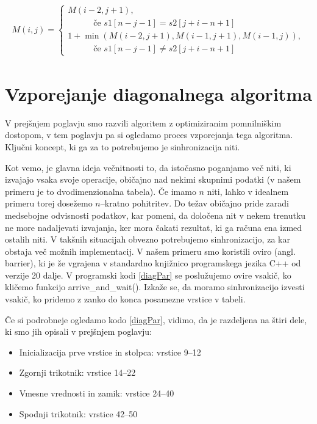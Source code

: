 \documentclass[a4paper,12pt,openright]{book}
\begin{document}
\begin{itemize}
\begin{equation}
\label{diagEq5}
\begin{aligned}
M(i, j) =
\begin{cases}
     M(i-2, j+1) ,     \\ \quad \quad \quad \text{če } s1[n-j-1]=s2[j+i-n+1]\\
     1 + \min(M(i-2, j+1), M(i-1, j+1), M(i-1, j)) , \\ \quad \quad \quad \text{če } s1[n-j-1] \neq s2[j+i-n+1]
  \end{cases}
\end{aligned}
\end{equation}

\end{itemize}

\section{Vzporejanje diagonalnega algoritma}

V prejšnjem poglavju smo razvili algoritem z optimiziranim pomnilniškim dostopom, v tem poglavju pa si ogledamo proces vzporejanja tega algoritma. Ključni koncept, ki ga za to potrebujemo je sinhronizacija niti. 

Kot vemo, je glavna ideja večnitnosti to, da istočasno poganjamo več niti, ki izvajajo vsaka svoje operacije, običajno nad nekimi skupnimi podatki (v našem primeru je to dvodimenzionalna tabela). Če imamo $n$ niti, lahko v idealnem primeru torej dosežemo $n$--kratno pohitritev. Do težav običajno pride zaradi medsebojne odvisnosti podatkov, kar pomeni, da določena nit v nekem trenutku ne more nadaljevati izvajanja, ker mora čakati rezultat, ki ga računa ena izmed ostalih niti. V takšnih situacijah obvezno potrebujemo sinhronizacijo, za kar obstaja več možnih implementacij. V našem primeru smo koristili oviro (angl. barrier), ki je že vgrajena v standardno knjižnico programskega jezika C++ od verzije 20 dalje. V programski kodi \ref{diagPar} se poslužujemo ovire vsakič, ko kličemo funkcijo arrive\_and\_wait(). Izkaže se, da moramo sinhronizacijo izvesti vsakič, ko pridemo z zanko do konca posamezne vrstice v tabeli.

Če si podrobneje ogledamo kodo \ref{diagPar}, vidimo, da je razdeljena na štiri dele, ki smo jih opisali v prejšnjem poglavju: 
\begin{itemize}
\item Inicializacija prve vrstice in stolpca: vrstice 9--12
\item Zgornji trikotnik: vrstice 14--22
\item Vmesne vrednosti in zamik: vrstice 24--40
\item Spodnji trikotnik: vrstice 42--50
\end{itemize}
\end{document}
